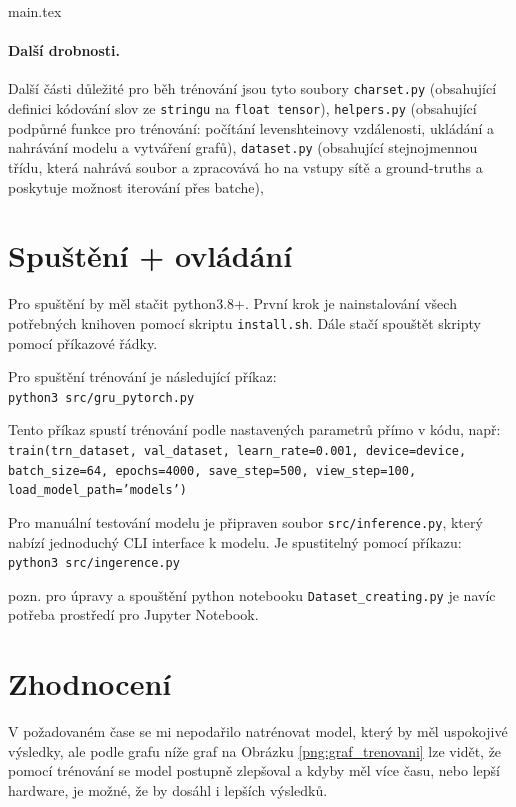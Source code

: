 main.tex\documentclass[a4paper]{article}
\theoremstyle{definition}
\begin{document}
\paragraph{Další drobnosti.}
Další části důležité pro běh trénování jsou tyto soubory \texttt{charset.py} (obsahující definici kódování slov ze \texttt{stringu} na \texttt{float tensor}), \texttt{helpers.py} (obsahující podpůrné funkce pro trénování: počítání levenshteinovy vzdálenosti, ukládání a nahrávání modelu a vytváření grafů), \texttt{dataset.py} (obsahující stejnojmennou třídu, která nahrává soubor a zpracovává ho na vstupy sítě a ground-truths a poskytuje možnost iterování přes batche),


\section{Spuštění + ovládání}

Pro spuštění by měl stačit python3.8+. První krok je nainstalování všech potřebných knihoven pomocí skriptu \texttt{install.sh}. Dále stačí spouštět skripty pomocí příkazové řádky.

Pro spuštění trénování je následující příkaz: \\
\texttt{python3 src/gru\_pytorch.py}

Tento příkaz spustí trénování podle nastavených parametrů přímo v kódu, např: \\
\texttt{train(trn\_dataset, val\_dataset, learn\_rate=0.001, device=device, \\
batch\_size=64, epochs=4000, save\_step=500, view\_step=100, \\
load\_model\_path='models')}

Pro manuální testování modelu je připraven soubor \texttt{src/inference.py}, který nabízí jednoduchý CLI interface k modelu. Je spustitelný pomocí příkazu: \\
\texttt{python3 src/ingerence.py}

pozn. pro úpravy a spouštění python notebooku \texttt{Dataset\_creating.py} je navíc potřeba prostředí pro Jupyter Notebook.

\section{Zhodnocení}
V požadovaném čase se mi nepodařilo natrénovat model, který by měl uspokojivé výsledky, ale podle grafu níže graf na Obrázku \ref{png:graf_trenovani} lze vidět, že pomocí trénování se model postupně zlepšoval a kdyby měl více času, nebo lepší hardware, je možné, že by dosáhl i lepších výsledků.
\end{document}
